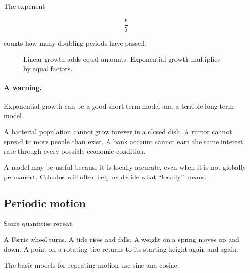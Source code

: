The exponent

\[
\frac{t}{5}
\]

counts how many doubling periods have passed.

\begin{figure}[h]
\centering
{}
\caption{Linear growth adds equal amounts. Exponential growth multiplies by equal factors.}
\label{fig:linear-versus-exponential-models}
\end{figure}

\paragraph{A warning.}
Exponential growth can be a good short-term model and a terrible long-term model.

A bacterial population cannot grow forever in a closed dish. A rumor cannot spread to more people than exist. A bank account cannot earn the same interest rate through every possible economic condition.

A model may be useful because it is locally accurate, even when it is not globally permanent. Calculus will often help us decide what ``locally'' means.

\subsection{Periodic motion}
\label{subsec:periodic-motion-models}

Some quantities repeat.

A Ferris wheel turns. A tide rises and falls. A weight on a spring moves up and down. A point on a rotating tire returns to its starting height again and again.

The basic models for repeating motion use sine and cosine.

